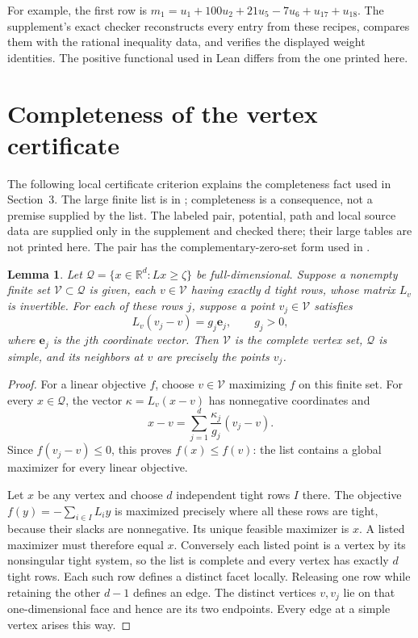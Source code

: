\documentclass[11pt]{article}
\newtheorem{lemma}[theorem]{Lemma}
\theoremstyle{remark}
\newcommand{\R}{\mathbb R}
\begin{document}
\begin{appendices}
For example, the first row is
$m_1=u_1+100u_2+21u_5-7u_6+u_{17}+u_{18}$.
The supplement's exact checker reconstructs every entry from these
recipes, compares them with the rational inequality data, and verifies
the displayed weight identities. The positive functional used in Lean
differs from the one printed here.

\section{Completeness of the vertex certificate}\label{app:cover}

The following local certificate criterion explains the completeness fact
used in Section~3. The large finite list is in \cite{supplement};
completeness is a consequence, not a premise supplied by the list.
The labeled pair, potential, path and local source data are supplied
only in the supplement and checked there; their large tables are not
printed here. The pair has the complementary-zero-set form used in
\cite[proof of Proposition~8]{adkz}.

\begin{lemma}\label{lem:cover}
Let $\mathcal Q=\{x\in\R^d:Lx\ge\zeta\}$ be full-dimensional.
Suppose a nonempty finite set $\mathcal V\subset\mathcal Q$ is given, each $v\in \mathcal V$
having exactly $d$ tight rows, whose matrix $L_v$ is invertible.
For each of these rows $j$, suppose a point $v_j\in \mathcal V$ satisfies
\[
 L_v(v_j-v)=g_j\mathbf e_j,\qquad g_j>0,
\]
where $\mathbf e_j$ is the $j$th coordinate vector. Then $\mathcal V$ is the complete
vertex set, $\mathcal Q$ is simple, and its neighbors at $v$ are precisely
the points $v_j$.
\end{lemma}
\begin{proof}
For a linear objective $f$, choose $v\in \mathcal V$ maximizing $f$ on this finite
set. For every $x\in\mathcal Q$, the vector $\kappa=L_v(x-v)$ has
nonnegative coordinates and
\[
 x-v=\sum_{j=1}^d\frac{\kappa_j}{g_j}(v_j-v).
\]
Since $f(v_j-v)\le0$, this proves $f(x)\le f(v)$: the list contains a
global maximizer for every linear objective.

Let $x$ be any vertex and choose $d$ independent tight rows $I$ there.
The objective $f(y)=-\sum_{i\in I}L_i y$ is maximized precisely where
all these rows are tight, because their slacks are nonnegative.
Its unique feasible maximizer is $x$. A listed maximizer must therefore
equal $x$. Conversely each listed point is a vertex by its nonsingular
tight system, so the list is complete and every vertex has exactly $d$
tight rows. Each such row defines a distinct facet locally. Releasing one
row while retaining the other $d-1$ defines an edge. The distinct vertices
$v,v_j$ lie on that one-dimensional face and hence are its two endpoints.
Every edge at a simple vertex arises this way.
\end{proof}


\end{appendices}
\end{document}
